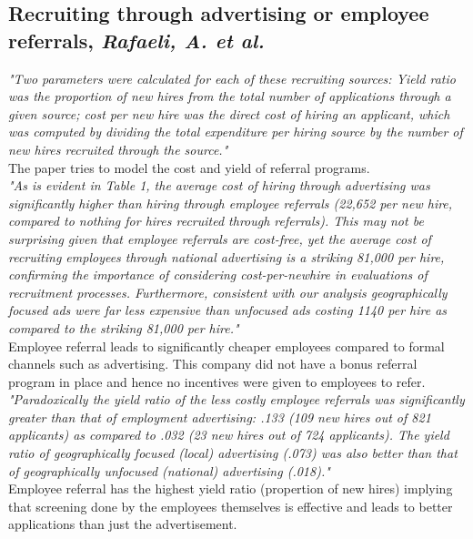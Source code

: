 \documentclass[a4paper, 11pt]{article} %
\begin{document}
\subsection*{Recruiting through advertising or employee referrals, \emph{Rafaeli, A. et al.} \cite{fourth}}

\emph{"Two parameters were calculated for each of these recruiting sources: Yield
ratio was the proportion of new hires from the total number of applications
through a given source; cost per new hire was the direct cost of hiring an
applicant, which was computed by dividing the total expenditure per hiring
source by the number of new hires recruited through the source."}\\

The paper tries to model the cost and yield of referral programs.\\

\emph{"As is evident in Table 1, the average cost of hiring through advertising was
significantly higher than hiring through employee referrals (22,652 per new
hire, compared to nothing for hires recruited through referrals). This may
not be surprising given that employee referrals are cost-free, yet the average
cost of recruiting employees through national advertising is a striking
81,000 per hire, confirming the importance of considering cost-per-newhire
in evaluations of recruitment processes. Furthermore, consistent with
our analysis geographically focused ads were far less expensive than
unfocused ads costing 1140 per hire as compared to the striking 81,000 per
hire."}\\

Employee referral leads to significantly cheaper employees compared to formal channels such as advertising. This company did not have a bonus referral program in place and hence no incentives were given to employees to refer.\\

\emph{"Paradoxically the yield ratio of the less costly employee referrals was
significantly greater than that of employment advertising: .133 (109 new
hires out of 821 applicants) as compared to .032 (23 new hires out of 724
applicants). The yield ratio of geographically focused (local) advertising
(.073) was also better than that of geographically unfocused (national)
advertising (.018)."}\\

Employee referral has the highest yield ratio (propertion of new hires) implying that screening done by the employees themselves is effective and leads to better applications than just the advertisement.
\end{document}
